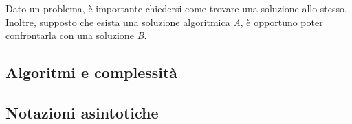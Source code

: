 \documentclass{subfiles}
\begin{document}
Dato un problema, è importante chiedersi come trovare una soluzione allo stesso.
Inoltre, supposto che esista una soluzione algoritmica \emph{A}, è opportuno poter confrontarla con una soluzione \emph{B}.

\subsection{Algoritmi e complessità}


\subsection{Notazioni asintotiche}

\end{document}
